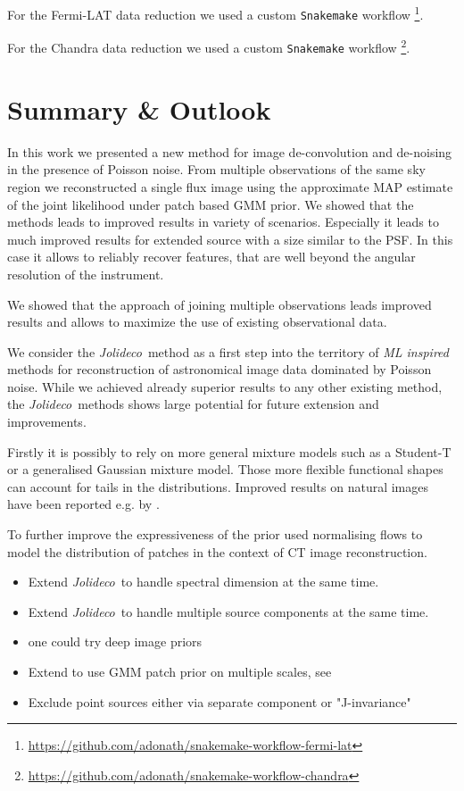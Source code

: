 \documentclass[twocolumn]{aastex631}
\newcommand{\jolideco}{\textit{Jolideco}~}
\begin{document}
    For the Fermi-LAT data reduction we used a custom \texttt{Snakemake} workflow \footnote{\url{https://github.com/adonath/snakemake-workflow-fermi-lat}}.

    For the Chandra data reduction we used a custom \texttt{Snakemake} workflow \footnote{\url{https://github.com/adonath/snakemake-workflow-chandra}}.
        
    
    \section{Summary \& Outlook}
    In this work we presented a new method for image de-convolution and de-noising in the presence of Poisson noise. From multiple observations of the same sky region we reconstructed a single flux image using the approximate MAP estimate of the joint likelihood under patch based GMM prior. We showed that the methods leads to improved results in variety of scenarios. Especially it leads to much improved results for extended source with a size similar to the PSF. In this case it allows to reliably recover features, that are well beyond the angular resolution of the instrument.

    We showed that the approach of joining multiple observations leads improved results and allows to maximize the use of existing observational data.

    We consider the \jolideco method as a first step into the territory of \textit{ML inspired} methods for reconstruction of astronomical image data dominated by Poisson noise. While we achieved already superior results to any other existing method, 
    the \jolideco methods shows large potential for future extension and improvements. 
    
    Firstly it is possibly to rely on more general mixture models such as a Student-T or a generalised Gaussian mixture model. Those more flexible functional shapes can account for tails in the distributions. Improved results on natural images have been reported e.g. by \cite{}.

    To further improve the expressiveness of the prior \cite{Altekrueger2022} used normalising flows to model the distribution of patches in the context of CT image reconstruction.
    
    \begin{itemize}
        \item Extend \jolideco to handle spectral dimension at the same time.
        \item Extend \jolideco to handle multiple source components at the same time.
        \item one could try deep image priors \citep{Ulyanov2017}
        \item Extend to use GMM patch prior on multiple scales, see \cite{Papyan2015}
        \item Exclude point sources either via separate component or "J-invariance"
    \end{itemize}
\end{document}
